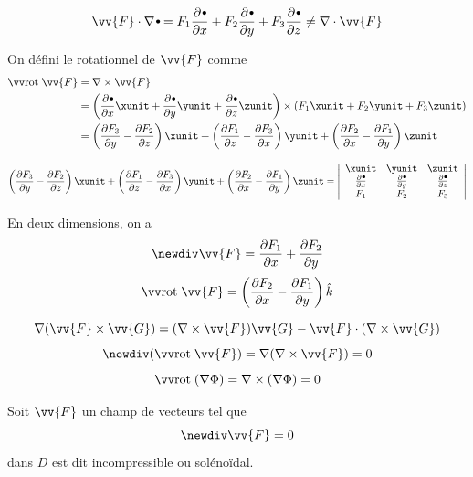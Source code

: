 \begin{myrem}
	\[ \vv{F} \cdot \nabla \sbt = F_1 \frac{\pa \sbt}{\pa x} + F_2 \frac{\pa \sbt}{\pa y} + F_3 \frac{\pa \sbt}{\pa z}
	\neq \nabla \cdot \vv{F} \]
\end{myrem}

\begin{mydef}[Rotationnel] On défini le rotationnel de $\vv{F}$ comme
	\begin{align*} \rot \vv{F} & = \nabla \times \vv{F} \\
		& = \left( \frac{\pa \sbt}{\pa x} \xunit + \frac{\pa \sbt}{\pa y} \yunit + \frac{\pa \sbt}{\pa z} \zunit \right) \times \left( F_1 \xunit + F_2 \yunit + F_3 \zunit \right) \\
		& = \left( \frac{\pa F_3}{\pa y} -  \frac{\pa F_2}{\pa z} \right) \xunit + \left( \frac{\pa F_1}{\pa z} -  \frac{\pa F_3}{\pa x} \right) \yunit + \left( \frac{\pa F_2}{\pa x} -  \frac{\pa F_1}{\pa y} \right) \zunit
	\end{align*}
\end{mydef}

\begin{myrem}
	\[ \left( \frac{\pa F_3}{\pa y} -  \frac{\pa F_2}{\pa z} \right) \xunit + \left( \frac{\pa F_1}{\pa z} -  \frac{\pa F_3}{\pa x} \right) \yunit + \left( \frac{\pa F_2}{\pa x} -  \frac{\pa F_1}{\pa y} \right) \zunit =
	\left|
	\begin{array}{ccc}
		\xunit & \yunit & \zunit \\
		\frac{\pa \sbt}{\pa x} & \frac{\pa \sbt}{\pa y} & \frac{\pa \sbt}{\pa z} \\
		F_1 & F_2 & F_3
	\end{array}
	\right| \]
\end{myrem}

\begin{myrem}[En 2 dimensions]
	En deux dimensions, on a
	\[ \newdiv \vv{F} = \frac{\pa F_1}{\pa x} + \frac{\pa F_2}{\pa y} \]
	\[ \rot \vv{F} = \left( \frac{\pa F_2}{\pa x} - \frac{\pa F_1}{\pa y} \right) \hat{k} \]
\end{myrem}

\begin{myform}
	\[ \nabla (\vv{F} \times \vv{G}) = (\nabla \times \vv{F})\vv{G} - \vv{F} \cdot (\nabla \times \vv{G}) \]
	\[ \newdiv ( \rot \vv{F}) = \nabla (\nabla \times \vv{F}) = 0 \]
	\[ \rot (\nabla \Phi) = \nabla \times (\nabla \Phi) = 0 \]
\end{myform}

\begin{mydef} Soit $\vv{F}$ un champ de vecteurs tel que
	\[ \newdiv \vv{F} = 0 \]
	dans $D$ est dit incompressible ou solénoïdal.
\end{mydef}

